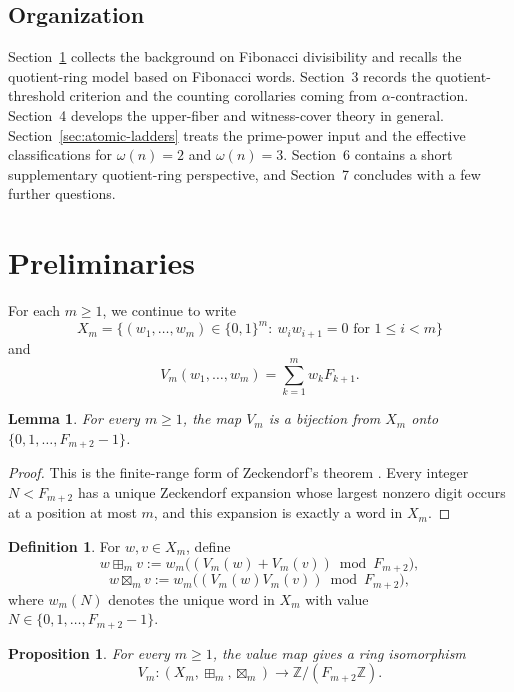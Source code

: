 \documentclass[11pt,letterpaper]{article}
\numberwithin{equation}{section}
\theoremstyle{plain}
\newtheorem{lemma}[theorem]{Lemma}
\newtheorem{proposition}[theorem]{Proposition}
\theoremstyle{definition}
\newtheorem{definition}[theorem]{Definition}
\theoremstyle{remark}
\newcommand{\ZZ}{\mathbb{Z}}
\begin{document}
\subsection*{Organization}

Section~\ref{sec:preliminaries} collects the background on Fibonacci
divisibility and recalls the quotient-ring model based on Fibonacci words.
Section~3 records the quotient-threshold criterion and the counting corollaries
coming from $\alpha$-contraction. Section~4 develops the upper-fiber and
witness-cover theory in general. Section~\ref{sec:atomic-ladders} treats the
prime-power input and the effective classifications for $\omega(n)=2$ and
$\omega(n)=3$. Section~6 contains a short supplementary quotient-ring
perspective, and Section~7 concludes with a few further questions.

\section{Preliminaries}
\label{sec:preliminaries}

For each $m\ge 1$, we continue to write
\[
X_m=\{(w_1,\dots,w_m)\in\{0,1\}^m:\ w_iw_{i+1}=0\text{ for }1\le i<m\}
\]
and
\[
V_m(w_1,\dots,w_m)=\sum_{k=1}^m w_kF_{k+1}.
\]

\begin{lemma}
\label{lem:zeckendorf-range-bijection}
For every $m\ge 1$, the map $V_m$ is a bijection from $X_m$ onto
$\{0,1,\dots,F_{m+2}-1\}$.
\end{lemma}

\begin{proof}
This is the finite-range form of Zeckendorf's theorem \cite{Zeckendorf1972}.
Every integer $N<F_{m+2}$ has a unique Zeckendorf expansion whose largest
nonzero digit occurs at a position at most $m$, and this expansion is exactly a
word in $X_m$.
\end{proof}

\begin{definition}
\label{def:finite-resolution-arithmetic}
For $w,v\in X_m$, define
\[
w\boxplus_m v:=w_m\bigl((V_m(w)+V_m(v))\bmod F_{m+2}\bigr),
\]
\[
w\boxtimes_m v:=w_m\bigl((V_m(w)V_m(v))\bmod F_{m+2}\bigr),
\]
where $w_m(N)$ denotes the unique word in $X_m$ with value
$N\in\{0,1,\dots,F_{m+2}-1\}$.
\end{definition}

\begin{proposition}
\label{thm:finite-resolution-mod}
For every $m\ge 1$, the value map gives a ring isomorphism
\[
V_m:(X_m,\boxplus_m,\boxtimes_m)\longrightarrow \ZZ/(F_{m+2}\ZZ).
\]
\end{proposition}
\end{document}
